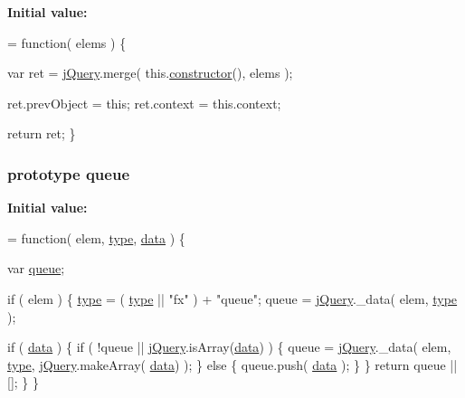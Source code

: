 {\bfseries Initial value\-:}
\begin{DoxyCode}
= \textcolor{keyword}{function}( elems ) \{



        
        var ret = \hyperlink{jquery-1_810_82-vsdoc_8js_add5237586d970a38a81f990e8eb28c6c}{jQuery}.merge( this.\hyperlink{jquery-1_810_82-vsdoc_8js_ac8c7ab4467fc25f40e85c72221a1f10b}{constructor}(), elems );

        
        ret.prevObject = \textcolor{keyword}{this};
        ret.context = this.context;

        
        \textcolor{keywordflow}{return} ret;
    \}
\end{DoxyCode}
\hypertarget{jquery-1_810_82-vsdoc_8js_a4a4ce67ab280eb2cff0622a3bdc1f5b3}{
\subsubsection[{queue}]{ {\bf prototype} queue}}\label{jquery-1_810_82-vsdoc_8js_a4a4ce67ab280eb2cff0622a3bdc1f5b3}
{\bfseries Initial value\-:}
\begin{DoxyCode}
= \textcolor{keyword}{function}( elem, \hyperlink{jquery-1_810_82-vsdoc_8js_a3940565e83a9bfd10d95ffd27536da91}{type}, \hyperlink{jquery-1_810_82-vsdoc_8js_a609407b3456fdc3c5671a9fc4a226ff7}{data} ) \{


        var \hyperlink{jquery-1_810_82-vsdoc_8js_a4a4ce67ab280eb2cff0622a3bdc1f5b3}{queue};

        \textcolor{keywordflow}{if} ( elem ) \{
            \hyperlink{jquery-1_810_82-vsdoc_8js_a3940565e83a9bfd10d95ffd27536da91}{type} = ( \hyperlink{jquery-1_810_82-vsdoc_8js_a3940565e83a9bfd10d95ffd27536da91}{type} || \textcolor{stringliteral}{"fx"} ) + \textcolor{stringliteral}{"queue"};
            queue = \hyperlink{jquery-1_810_82-vsdoc_8js_add5237586d970a38a81f990e8eb28c6c}{jQuery}.\_data( elem, \hyperlink{jquery-1_810_82-vsdoc_8js_a3940565e83a9bfd10d95ffd27536da91}{type} );

            
            \textcolor{keywordflow}{if} ( \hyperlink{jquery-1_810_82-vsdoc_8js_a609407b3456fdc3c5671a9fc4a226ff7}{data} ) \{
                \textcolor{keywordflow}{if} ( !queue || \hyperlink{jquery-1_810_82-vsdoc_8js_add5237586d970a38a81f990e8eb28c6c}{jQuery}.isArray(\hyperlink{jquery-1_810_82-vsdoc_8js_a609407b3456fdc3c5671a9fc4a226ff7}{data}) ) \{
                    queue = \hyperlink{jquery-1_810_82-vsdoc_8js_add5237586d970a38a81f990e8eb28c6c}{jQuery}.\_data( elem, \hyperlink{jquery-1_810_82-vsdoc_8js_a3940565e83a9bfd10d95ffd27536da91}{type}, \hyperlink{jquery-1_810_82-vsdoc_8js_add5237586d970a38a81f990e8eb28c6c}{jQuery}.makeArray(
      \hyperlink{jquery-1_810_82-vsdoc_8js_a609407b3456fdc3c5671a9fc4a226ff7}{data}) );
                \} \textcolor{keywordflow}{else} \{
                    queue.push( \hyperlink{jquery-1_810_82-vsdoc_8js_a609407b3456fdc3c5671a9fc4a226ff7}{data} );
                \}
            \}
            \textcolor{keywordflow}{return} queue || [];
        \}
    \}
\end{DoxyCode}
